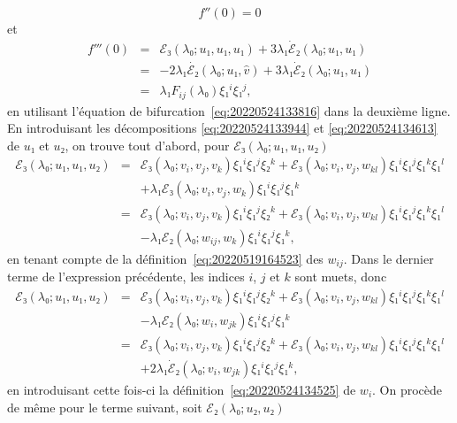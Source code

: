 \documentclass[12pt, final]{amsart}
\theoremstyle{definition}
\begin{document}
\begin{equation}
 \label{eq:20220525053600 derivee 2nde} f''(0) = 0
\end{equation}
et
\begin{eqnarray}
 f'''(0) & = & ℰ₃(λ₀ ; u₁, u₁, u₁) + 3 λ₁
 \dot{ℰ}₂(λ₀ ; u₁, u₁) \nonumber\\
 & = & - 2 λ₁ \dot{ℰ₂}(λ₀ ; u₁, \hat{v}) + 3
 λ₁ \dot{ℰ}₂(λ₀ ; u₁, u₁) \nonumber\\
 & = & λ₁ F_{i j}(λ₀) ξ₁^i ξ₁^j, \label{eq:DL
 energie derivee 3ieme}
\end{eqnarray}
en utilisant l'équation de bifurcation~\eqref{eq:20220524133816} dans la deuxième ligne. En introduisant les décompositions \eqref{eq:20220524133944} et \eqref{eq:20220524134613} de \(u₁\) et \(u₂\), on trouve tout d'abord, pour \(ℰ₃(λ₀ ; u₁, u₁, u₂)\)
\begin{eqnarray*}
 ℰ₃(λ₀ ; u₁, u₁, u₂) & = & ℰ₃(λ₀ ;
 v_i, v_j, v_k) ξ₁^i ξ₁^j ξ₂^k +ℰ₃(λ₀ ; v_i, v_j,
 w_{k l}) ξ₁^i ξ₁^j ξ₁^k ξ₁^l\\
 & & + λ₁ ℰ₃(λ₀ ; v_i, v_j, w_k)
 ξ₁^i ξ₁^j ξ₁^k\\
 & = & ℰ₃(λ₀ ; v_i, v_j, v_k) ξ₁^i ξ₁^j ξ₂^k
 +ℰ₃(λ₀ ; v_i, v_j, w_{k l}) ξ₁^i ξ₁^j
 ξ₁^k ξ₁^l\\
 & & - λ₁ ℰ₂(λ₀ ; w_{i j},
 w_k) ξ₁^i ξ₁^j ξ₁^k,
\end{eqnarray*}
en tenant compte de la définition~\eqref{eq:20220519164523} des \(w_{i j}\). Dans le dernier terme de l'expression précédente, les indices \(i\), \(j\) et \(k\) sont muets, donc
\begin{eqnarray*}
 ℰ₃(λ₀ ; u₁, u₁, u₂) & = & ℰ₃(λ₀ ;
 v_i, v_j, v_k) ξ₁^i ξ₁^j ξ₂^k +ℰ₃(λ₀ ; v_i, v_j,
 w_{k l}) ξ₁^i ξ₁^j ξ₁^k ξ₁^l\\
 & & - λ₁ ℰ₂(λ₀ ; w_{i }, w_{j
  k}) ξ₁^i ξ₁^j ξ₁^k\\
 & = & ℰ₃(λ₀ ; v_i, v_j, v_k) ξ₁^i ξ₁^j ξ₂^k
 +ℰ₃(λ₀ ; v_i, v_j, w_{k l}) ξ₁^i ξ₁^j
 ξ₁^k ξ₁^l\\
 & & + 2 λ₁ \dot{ℰ}₂(λ₀ ; v_{i
 }, w_{j k}) ξ₁^i ξ₁^j ξ₁^k,
\end{eqnarray*}
en introduisant cette fois-ci la définition~\eqref{eq:20220524134525} de \(w_i .\) On procède de même pour le terme suivant, soit \(ℰ₂(λ₀ ; u₂, u₂)\)
\end{document}
